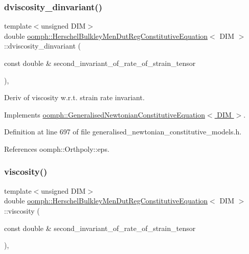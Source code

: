 \subsubsection{\texorpdfstring{dviscosity\+\_\+dinvariant()}{dviscosity\_dinvariant()}}
{\footnotesize\ttfamily template$<$unsigned D\+IM$>$ \\
double \hyperlink{classoomph_1_1HerschelBulkleyMenDutRegConstitutiveEquation}{oomph\+::\+Herschel\+Bulkley\+Men\+Dut\+Reg\+Constitutive\+Equation}$<$ D\+IM $>$\+::dviscosity\+\_\+dinvariant (\begin{DoxyParamCaption}\item[{const double \&}]{second\+\_\+invariant\+\_\+of\+\_\+rate\+\_\+of\+\_\+strain\+\_\+tensor }\end{DoxyParamCaption})\hspace{0.3cm}{\ttfamily [inline]}, {\ttfamily [virtual]}}



Deriv of viscosity w.\+r.\+t. strain rate invariant. 



Implements \hyperlink{classoomph_1_1GeneralisedNewtonianConstitutiveEquation_ad0164e6ca57cc986048346e12c4d353a}{oomph\+::\+Generalised\+Newtonian\+Constitutive\+Equation$<$ D\+I\+M $>$}.



Definition at line 697 of file generalised\+\_\+newtonian\+\_\+constitutive\+\_\+models.\+h.



References oomph\+::\+Orthpoly\+::eps.

\mbox{\label{classoomph_1_1HerschelBulkleyMenDutRegConstitutiveEquation_acd2e8cb9f733c39736294631dabe61dd}} 
\subsubsection{\texorpdfstring{viscosity()}{viscosity()}}
{\footnotesize\ttfamily template$<$unsigned D\+IM$>$ \\
double \hyperlink{classoomph_1_1HerschelBulkleyMenDutRegConstitutiveEquation}{oomph\+::\+Herschel\+Bulkley\+Men\+Dut\+Reg\+Constitutive\+Equation}$<$ D\+IM $>$\+::viscosity (\begin{DoxyParamCaption}\item[{const double \&}]{second\+\_\+invariant\+\_\+of\+\_\+rate\+\_\+of\+\_\+strain\+\_\+tensor }\end{DoxyParamCaption})\hspace{0.3cm}{\ttfamily [inline]}, {\ttfamily [virtual]}}



